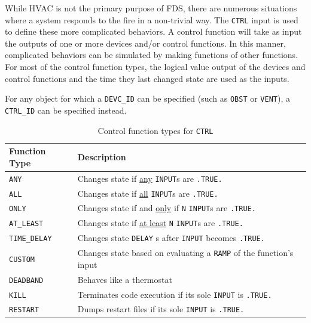 \documentclass[11pt]{book}
\newcommand{\ct}{\tt\small}
\begin{document}
While HVAC is not the primary purpose of FDS, there are numerous situations where a system responds to
the fire in a non-trivial way.  The {\ct CTRL} input is used to define these more complicated behaviors.
A control function will take as input the outputs of one or more devices and/or control functions.
In this manner, complicated behaviors can be simulated by making functions of other functions.  For most of the
control function types, the logical value output of the devices and control functions and the time they last changed
state are used as the inputs.

For any object for which a {\ct DEVC\_ID} can be specified (such as {\ct OBST} or {\ct VENT}), a {\ct CTRL\_ID} can be
specified instead.
\begin{table}[h!]
\caption{Control function types for {\ct CTRL}}
\label{tab:funcvalues}
\begin{center}
\begin{tabular}{|l||l|}
\hline
Function Type                     & Description   \\ \hline \hline
{\ct ANY}                         & Changes state if \underline{any} {\ct INPUT}s are {\ct .TRUE.}     \\ \hline
{\ct ALL}                         & Changes state if \underline{all} {\ct INPUT}s are {\ct .TRUE.}  \\ \hline
{\ct ONLY}                        & Changes state if and \underline{only} if {\ct N} {\ct INPUT}s are {\ct .TRUE.}     \\ \hline
{\ct AT\_LEAST}                   & Changes state if \underline{at least} {\ct N} {\ct INPUT}s are {\ct .TRUE.}     \\ \hline \hline
{\ct TIME\_DELAY}                 & Changes state {\ct DELAY} s after {\ct INPUT} becomes {\ct .TRUE.}      \\ \hline
{\ct CUSTOM}                      & Changes state based on evaluating a {\ct RAMP} of the function's input     \\ \hline
{\ct DEADBAND}                    & Behaves like a thermostat     \\ \hline
{\ct KILL}                        & Terminates code execution if its sole {\ct INPUT} is {\ct .TRUE.}  \\ \hline
{\ct RESTART}                     & Dumps restart files if its sole {\ct INPUT} is {\ct .TRUE.} \\ \hline

\end{tabular}
\end{center}
\end{table}
\end{document}
